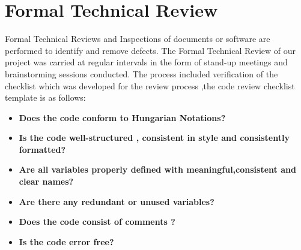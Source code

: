 \documentclass[openany,12pt]{report}
\begin{document}
		\section{Formal Technical Review}
		\hspace*{0.5in}Formal Technical Reviews and Inspections of documents or software are performed to identify and remove defects. The Formal Technical Review of our project was carried at regular intervals in the form of stand-up meetings and brainstorming sessions conducted. The process included verification of the checklist which was developed for the review process ,the code review  checklist template is as follows:
		
		\begin{itemize}
			\item{\textbf{Does the code conform to Hungarian Notations?}}
			\item{\textbf{Is the code well-structured , consistent in style and consistently formatted?}}
			\item{\textbf{Are all variables properly defined with meaningful,consistent and clear names?}}
			\item{\textbf{Are there any redundant or unused variables?}}
			\item{\textbf{Does the code consist of comments ?}}
			\item{\textbf{Is the code error free?}}
			
		\end{itemize}
		
		
\end{document}
